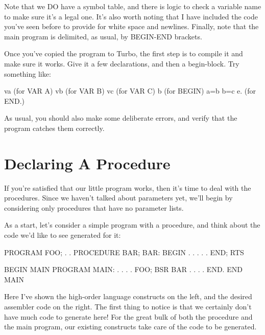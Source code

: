 \documentclass[float=false, crop=false]{standalone}
\begin{document}
Note that we DO have a symbol table, and there is logic to check a variable name
to make sure it's a legal one. It's also worth noting that I have included the
code you've seen before to provide for white space and newlines. Finally, note
that the main program is delimited, as usual, by BEGIN-END brackets.

Once you've copied the program to Turbo, the first step is to compile it and
make sure it works. Give it a few declarations, and then a begin-block. Try
something like:


     va             (for VAR A)
     vb             (for VAR B)
     vc             (for VAR C)
     b              (for BEGIN)
     a=b
     b=c
     e.             (for END.)


As usual, you should also make some deliberate errors, and verify
that the program catches them correctly.


\section{Declaring A Procedure}

If you're satisfied that our little program works, then it's time to deal with
the procedures. Since we haven't talked about parameters yet, we'll begin by considering only procedures that have no
parameter lists.

As a start, let's consider a simple program with a procedure, and think about
the code we'd like to see generated for it:


     PROGRAM FOO;
     .
     .
     PROCEDURE BAR;                     BAR:
     BEGIN                                   .
     .                                       .
     .                                       .
     END;                                    RTS

     BEGIN { MAIN PROGRAM }             MAIN:
     .                                       .
     .                                       .
     FOO;                                    BSR BAR
     .                                       .
     .                                       .
     END.                                    END MAIN


Here I've shown the high-order language constructs on the left, and the desired
assembler code on the right. The first thing to notice is that we certainly
don't have much code to generate here! For the great bulk of both the procedure
and the main program, our existing constructs take care of the code to be
generated.
\end{document}
